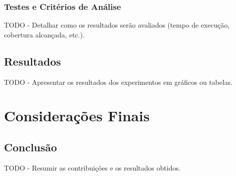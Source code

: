 \documentclass[12pt, a4paper]{report}
\begin{document}
\subsection{Testes e Critérios de Análise}
TODO - Detalhar como os resultados serão avaliados (tempo de execução, cobertura alcançada, etc.).

\section{Resultados}
TODO - Apresentar os resultados dos experimentos em gráficos ou tabelas.

\chapter{Considerações Finais}

\section{Conclusão}
TODO - Resumir as contribuições e os resultados obtidos.

\newpage
\renewcommand{\refname}{Referências Bibliográficas}

\nocite{lopesfilho2019, carvalho2022, carnielli}
\end{document}
